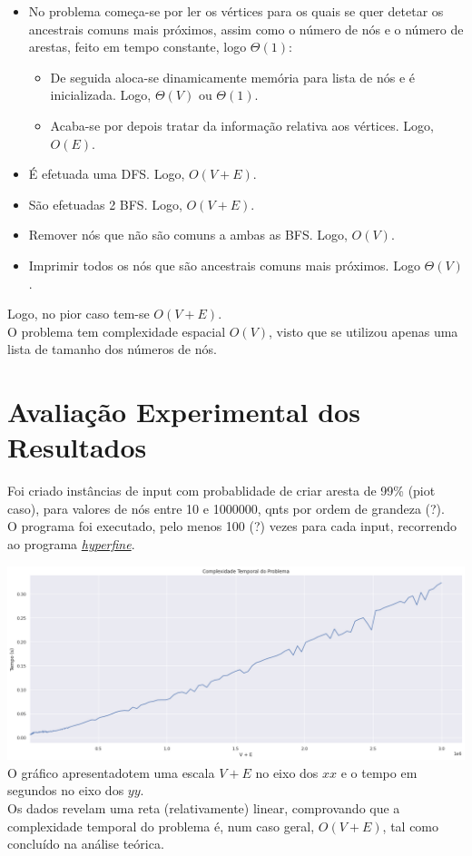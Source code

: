 \documentclass[12pt,a4paper]{article}
\begin{document}
  \begin{itemize}
    \setlength{\itemsep}{0pt}
    \item No problema começa-se por ler os vértices para os quais se quer detetar os ancestrais comuns mais próximos, assim como o número de nós e o número de arestas, feito em tempo constante, logo $\Theta(1)$:
    \begin{itemize}
      \setlength{\itemsep}{0pt}
      \item De seguida aloca-se dinamicamente memória para lista de nós e é inicializada. Logo, $\Theta(V)$ ou $\Theta(1)$.
      \item Acaba-se por depois tratar da informação relativa aos vértices. Logo, $O(E)$.
    \end{itemize}

   \item É efetuada uma DFS. Logo, $O(V + E)$.

  \item São efetuadas 2 BFS. Logo, $O(V + E)$.

  \item Remover nós que não são comuns a ambas as BFS. Logo, $O(V)$.

  \item Imprimir todos os nós que são ancestrais comuns mais próximos. Logo $\Theta(V)$.
  \end{itemize}
  Logo, no pior caso tem-se $O(V + E)$.\\
  O problema tem complexidade espacial $O(V)$, visto que se utilizou apenas uma lista de tamanho dos números de nós.

  \section{Avaliação Experimental dos Resultados}

  Foi criado instâncias de input com probablidade de criar aresta de 99\% (piot caso), para valores de nós entre 10 e 1000000, qnts por ordem de grandeza (?).\\
  O programa foi executado, pelo menos 100 (?) vezes para cada input, recorrendo ao programa \href{https://github.com/sharkdp/hyperfine}{\textit{hyperfine}}.
    
  \includegraphics[width=1\textwidth]{report.png}
  O gráfico apresentadotem uma escala $V + E$ no eixo dos $xx$ e o tempo em segundos no eixo dos $yy$.\\
  Os dados revelam uma reta (relativamente) linear, comprovando que a complexidade temporal do problema é, num caso geral, $O(V + E)$, tal como concluído na análise teórica.
\end{document}
